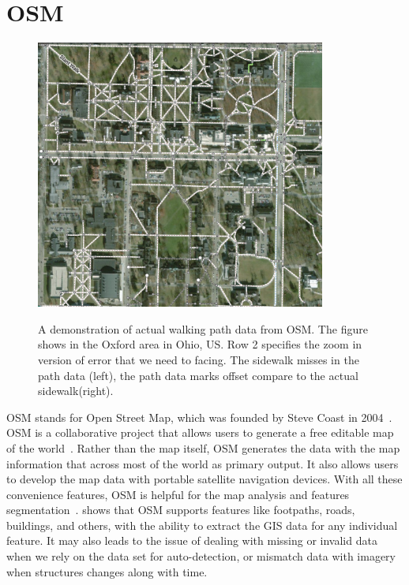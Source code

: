 \section{\ac{OSM}}
\begin{figure}[H]
    \centering
    \includegraphics[width=0.85\textwidth]{Figures/oxford_path_data_osm.png}
    \caption[\ac{OSM} Walking Path]{A demonstration of actual walking path data from \ac{OSM}. The figure shows in the Oxford area in Ohio, US. Row 2 specifies the zoom in version of error that we need to facing. The sidewalk misses in the path data (left), the path data marks offset compare to the actual sidewalk(right).}
    \cite{OpenStreetMap}
    \label{fig:osm_oxford_path}
\end{figure}

\ac{OSM} stands for Open Street Map, which was founded by Steve Coast in 2004~\cite{lasPiñas, OpenStreetMap}. 
\ac{OSM} is a collaborative project that allows users to generate a free editable map of the world~\cite{4653466}.
Rather than the map itself, \ac{OSM} generates the data with the map information that across most of the world as primary output. 
It also allows users to develop the map data with portable satellite navigation devices. 
With all these convenience features, \ac{OSM} is helpful for the map analysis and features segmentation~\cite{10.1007/11744078_9}. 
 shows that \ac{OSM} supports features like footpaths, roads, buildings, and others, with the ability to extract the \ac{GIS} data for any individual feature. 
It may also leads to the issue of dealing with missing or invalid data when we rely on the data set for auto-detection, or mismatch data with imagery when structures changes along with time.

